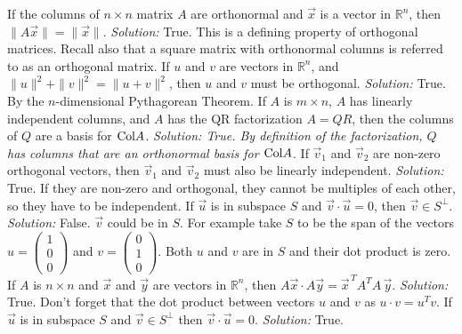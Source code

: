 \ifnum {}         
    If the columns of $n\times n$ matrix $A$ are orthonormal and $\vec x$ is a vector in $\mathbb R^n$, then $\| A\vec x \| = \|\vec x\|$. 
    \ifnum {} {\color{DarkBlue} \textit{Solution:  }  True. This is a defining property of orthogonal matrices. Recall also that a square matrix with orthonormal columns is referred to as an orthogonal matrix.  } \fi
\fi
\ifnum {}      
    If $u$ and $ v$ are vectors in $\mathbb R^n$, and $\| u \|^2 + \|v\|^2 = \|u+v\|^2$, then $u$ and $v$ must be orthogonal. 
    \ifnum {} {\color{DarkBlue} \textit{Solution:  } True. By the $n$-dimensional Pythagorean Theorem. } \fi
\fi    
\ifnum {}  
    If $A$ is $m\times n$, $A$ has linearly independent columns, and $A$ has the QR factorization $A=QR$, then the columns of $Q$ are a basis for $\text{Col} A$.
    \ifnum {} {\color{DarkBlue} \textit{Solution: True. By definition of the factorization, $Q$ has columns that are an orthonormal basis for $\text{Col} A$. }  } \fi
\fi    
\ifnum {}    
    If $\vec v_1$ and $\vec v_2$ are non-zero orthogonal vectors, then $\vec v_1$ and $\vec v_2$ must also be linearly independent. 
    \ifnum {} {\color{DarkBlue} \textit{Solution:  } True. If they are non-zero and orthogonal, they cannot be multiples of each other, so they have to be independent.} \fi
\fi   
\ifnum {}    
    If $\vec u$ is in subspace $S$ and $\vec v \cdot \vec u = 0$, then $\vec v \in S^{\perp}$.
    \ifnum {} {\color{DarkBlue} \textit{Solution:  } False. $\vec v$ could be in $S$. For example take $S$ to be the span of the vectors $u = \begin{pmatrix} 1\\0\\0\end{pmatrix}$ and $v=\begin{pmatrix} 0\\1\\0\end{pmatrix}$. Both $u$ and $v$ are in $S$ and their dot product is zero. } \fi
\fi    
\ifnum {}      
    If $A$ is $n \times n$ and $\vec x$ and $\vec y$ are vectors in $\mathbb R^{n}$, then $A\vec x \cdot A\vec y = \vec x^{\, T} A^TA\, \vec y$.
    \ifnum {} {\color{DarkBlue} \textit{Solution:  } True. Don't forget that the dot product between vectors $u$ and $v$ as $u\cdot v = u^T v$.  } \fi
\fi   
\ifnum {} 
   If $\vec u$ is in subspace $S$ and $\vec v \in S^{\perp}$ 
   then $\vec v \cdot \vec u = 0$.
 \ifnum {} {\color{DarkBlue} \textit{Solution:  }  True.  } \fi
